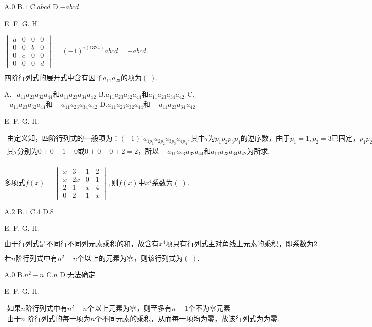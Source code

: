 A.$0$   B.$1$   C.$abcd$   D.$-abcd$

E.   F.   G.   H.

$\begin{vmatrix}a&0&0&0\\0&0&b&0\\0&c&0&0\\0&0&0&d\end{vmatrix}=(-1)^{\tau(1324)}abcd=-abcd.$


$\mathrm{四阶行列式的展开式中含有因子}a_{11}a_{23}\mathrm{的项为}(\;).$

A.$-a_{11}a_{23}a_{32}a_{44}和a_{11}a_{23}a_{34}a_{42}$   B.$a_{11}a_{23}a_{32}a_{44}和a_{11}a_{23}a_{34}a_{42}$   C.$-a_{11}a_{23}a_{32}a_{44}和-a_{11}a_{23}a_{34}a_{42}$   D.$a_{11}a_{23}a_{32}a_{44}和-a_{11}a_{23}a_{34}a_{42}$

E.   F.   G.   H.

$\begin{array}{l}\mathrm{由定义知}，\mathrm{四阶行列式的一般项为}：(-1)^\tau a_{1p_1}a_{2p_2}a_{3p_3}a_{4p_4},\mathrm{其中}\tau 为p_1p_2p_3p_4\mathrm{的逆序数}，\mathrm{由于}p_1=1,p_2=3\mathrm{已固定}，p_1p_2p_3p_4\mathrm{只能形如}13xx,即1324或1342，\\其\tau\mathrm{分别为}0+0+1+0或0+0+0+2=2，\mathrm{所以}-a_{11}a_{23}a_{32}a_{44}和a_{11}a_{23}a_{34}a_{42}\mathrm{为所求}.\\\end{array}$


$\mathrm{多项式}f(x)=\begin{vmatrix}x&3&1&2\\x&2x&0&1\\2&1&x&4\\0&2&1&x\end{vmatrix},则f(x)中x^4\mathrm{系数为}(\;).$

A.$2$   B.$1$   C.$4$   D.$8$

E.   F.   G.   H.

$\mathrm{由于行列式是不同行不同列元素乘积的和}，\mathrm{故含有}x^4\mathrm{项只有行列式主对角线上元素的乘积}，\mathrm{即系数为}2.$


$若n\mathrm{阶行列式中有}n^2-n\mathrm{个以上的元素为零}，\mathrm{则该行列式为}(\;).$

A.$0$   B.$n^2-n$   C.$n$   D.$\mathrm{无法确定}$

E.   F.   G.   H.

$\begin{array}{l}\mathrm{如果}n\mathrm{阶行列式中有}n^2-n\mathrm{个以上元素为零}，\mathrm{则至多有}n-1\mathrm{个不为零元素}\\\mathrm{由于}n\;\mathrm{阶行列式的每一项为}n\mathrm{个不同元素的乘积}，\mathrm{从而每一项均为零}，\mathrm{故该行列式为为零}.\end{array}$


